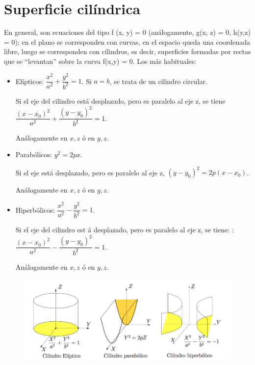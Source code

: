 \section{Superficie cilíndrica}


En general, son ecuaciones del tipo f (x, y) = 0 (análogamente, g(x, z) = 0, h(y,z) = 0); en el plano se corresponden con curvas, en el espacio queda una coordenada libre, luego se corresponden con cilindros, es decir, superficies formadas por rectas que se “levantan” sobre la curva f(x,y) = 0. Los más habituales: 

\begin{itemize}

\item Elípticos: $\dfrac{x^2}{a^2}+\dfrac{y^2}{b^2}=1$. Si $a = b$, se trata de un cilindro circular. 

Si el eje del cilindro está desplazado, pero es paralelo al eje z, se tiene $\dfrac{(x-x_0)^2}{a^2}+\dfrac{(y-y_0)^2}{b^2}=1$. 

Análogamente en $x, z$ ó en  $y, z$. 

\item Parabólicos: $y^2= 2px$. 

Si el eje está desplazado, pero es paralelo al eje z, $(y-y_0)^2=2p(x-x_0)$.  

Análogamente en $x, z$ ó en  $y, z$.
 
\item Hiperbólicos: $\dfrac{x^2}{a^2}-\dfrac{y^2}{b^2}=1$. 

Si el eje del cilindro est á desplazado, pero es paralelo al eje z, se tiene: : $\dfrac{(x-x_0)^2}{a^2}-\dfrac{(y-y_0)^2}{b^2}=1$.
 
Análogamente en $x, z$ ó en  $y, z$. 
\end{itemize}


\begin{figure}[H]
		\centering
		\includegraphics[width=1\textwidth]{imagenes/imagenes12/T12IM05.png}
	\end{figure}

